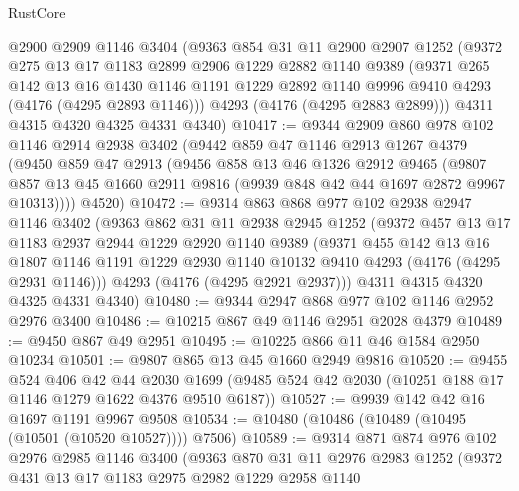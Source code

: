\begin{lexlean}{RustCore}
\begin{coremodule}
    @2900
    @2909
    @1146
    @3404
    (@9363
      @854
      @31
      @11
      @2900
      @2907
      @1252
      (@9372
        @275
        @13
        @17
        @1183
        @2899
        @2906
        @1229
        @2882
        @1140
        @9389
        (@9371
          @265
          @142
          @13
          @16
          @1430
          @1146
          @1191
          @1229
          @2892
          @1140
          @9996
          @9410
          @4293
          (@4176 (@4295 @2893 @1146)))
        @4293
        (@4176 (@4295 @2883 @2899)))
      @4311
      @4315
      @4320
      @4325
      @4331
      @4340)
@10417 := @9344
    @2909
    @860
    @978
    @102
    @1146
    @2914
    @2938
    @3402
    (@9442
      @859
      @47
      @1146
      @2913
      @1267
      @4379
      (@9450
        @859
        @47
        @2913
        (@9456
          @858
          @13
          @46
          @1326
          @2912
          @9465
          (@9807 @857 @13 @45 @1660 @2911 @9816 (@9939 @848 @42 @44 @1697 @2872 @9967 @10313))))
      @4520)
@10472 := @9314
    @863
    @868
    @977
    @102
    @2938
    @2947
    @1146
    @3402
    (@9363
      @862
      @31
      @11
      @2938
      @2945
      @1252
      (@9372
        @457
        @13
        @17
        @1183
        @2937
        @2944
        @1229
        @2920
        @1140
        @9389
        (@9371
          @455
          @142
          @13
          @16
          @1807
          @1146
          @1191
          @1229
          @2930
          @1140
          @10132
          @9410
          @4293
          (@4176 (@4295 @2931 @1146)))
        @4293
        (@4176 (@4295 @2921 @2937)))
      @4311
      @4315
      @4320
      @4325
      @4331
      @4340)
@10480 := @9344 @2947 @868 @977 @102 @1146 @2952 @2976 @3400
@10486 := @10215 @867 @49 @1146 @2951 @2028 @4379
@10489 := @9450 @867 @49 @2951
@10495 := @10225 @866 @11 @46 @1584 @2950 @10234
@10501 := @9807 @865 @13 @45 @1660 @2949 @9816
@10520 := @9455
    @524
    @406
    @42
    @44
    @2030
    @1699
    (@9485 @524 @42 @2030 (@10251 @188 @17 @1146 @1279 @1622 @4376 @9510 @6187))
@10527 := @9939 @142 @42 @16 @1697 @1191 @9967 @9508
@10534 := @10480 (@10486 (@10489 (@10495 (@10501 (@10520 @10527)))) @7506)
@10589 := @9314
    @871
    @874
    @976
    @102
    @2976
    @2985
    @1146
    @3400
    (@9363
      @870
      @31
      @11
      @2976
      @2983
      @1252
      (@9372
        @431
        @13
        @17
        @1183
        @2975
        @2982
        @1229
        @2958
        @1140

\end{coremodule}
\end{lexlean}
